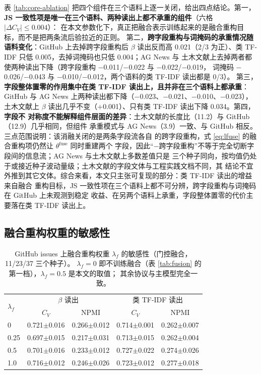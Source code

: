 \documentclass[11pt]{ctexart}
\begin{document}
表 \ref{tab:core-ablation} 把四个组件在三个语料上逐一关闭，给出四点结论。第一，\textbf{JS
一致性项是唯一在三个语料、两种读出上都不承重的组件}（六格 $|\Delta C_V| \leq 0.004$）：
在本文参数化下，真正把融合表示训练起来的是融合重构目标，而不是把两条流后验拉近的正则。
第二，\textbf{跨字段重构与词掩码的承重情况随语料变化}：GitHub 上去掉跨字段重构后 $\beta$
读出反而高 0.021（2/3 为正）、类 TF-IDF 只低 0.005，去掉词掩码也只低 0.004；AG News 与
土木文献上去掉两者都使两种读出下降（跨字段重构 $-$0.011/$-$0.022 与 $-$0.022/$-$0.019，
词掩码 $-$0.026/$-$0.043 与 $-$0.010/$-$0.012，两个语料的类 TF-IDF 读出都是 0/3）。
第三，\textbf{字段整体置零的作用集中在类 TF-IDF 读出上，且并非在三个语料上都承重}：
GitHub 与 AG News 上两种读出都下降（$-$0.023、$-$0.021、$-$0.010、$-$0.023），土木文献上
$\beta$ 读出几乎不变（$+$0.001）、只有类 TF-IDF 读出下降 0.034。第四，\textbf{字段不
对称度不能解释组件层面的差异}：土木文献的长度比（11.2）与 GitHub（12.9）几乎相同，但组件
承重模式与 AG News（3.9）一致、与 GitHub 相反。三点范围说明：该消融关闭的是两条字段流各自
的跨字段重构，式 \eqref{eq:lfuse} 的融合重构项仍然让 $\theta^{\mathrm{fuse}}$ 同时重建两个
字段，因此“$-$跨字段重构”不等于完全切断字段间的信息流；AG News 与土木文献上多数差值只是
三个种子同向，按均值仍处于或接近种子波动量级；土木文献的字段文体与工程实践文档不同，其
结论不宜外推到其它文体。综合来看，本文只主张可复现的部分：类 TF-IDF 读出的增益来自融合
重构目标，JS 一致性项在三个语料上都不可分辨，跨字段重构与词掩码在 GitHub 上未观测到稳定
收益、在另两个语料上承重，字段整体置零的代价主要落在类 TF-IDF 读出上。

\subsection{融合重构权重的敏感性}

\label{sec:weight-sweep}

\begin{table}[t]
\centering
\caption{GitHub issues 上融合重构权重 $\lambda_f$ 的敏感性（门控融合，11/23/37 三个种子）。
$\lambda_f=0$ 即不训练融合（表 \ref{tab:fusion} 的第一档），$\lambda_f=0.5$ 是本文的取值；
其余协议与主模型完全一致。}
\label{tab:weight}
\small
\setlength{\tabcolsep}{4pt}
\begin{tabular}{lcccc}
\toprule
\multirow{2}{*}{$\lambda_f$} & \multicolumn{2}{c}{$\beta$ 读出} & \multicolumn{2}{c}{类 TF-IDF 读出} \\
 & $C_V$ & NPMI & $C_V$ & NPMI \\
\midrule
0 & 0.721$\pm$0.016 & 0.266$\pm$0.012 & 0.714$\pm$0.001 & 0.262$\pm$0.007 \\
0.25 & 0.697$\pm$0.015 & 0.217$\pm$0.031 & 0.713$\pm$0.015 & 0.262$\pm$0.004 \\
0.5 & 0.701$\pm$0.016 & 0.233$\pm$0.012 & 0.727$\pm$0.022 & 0.274$\pm$0.026 \\
1.0 & 0.716$\pm$0.012 & 0.246$\pm$0.026 & 0.723$\pm$0.012 & 0.277$\pm$0.018 \\
\bottomrule
\end{tabular}
\end{table}
\end{document}
